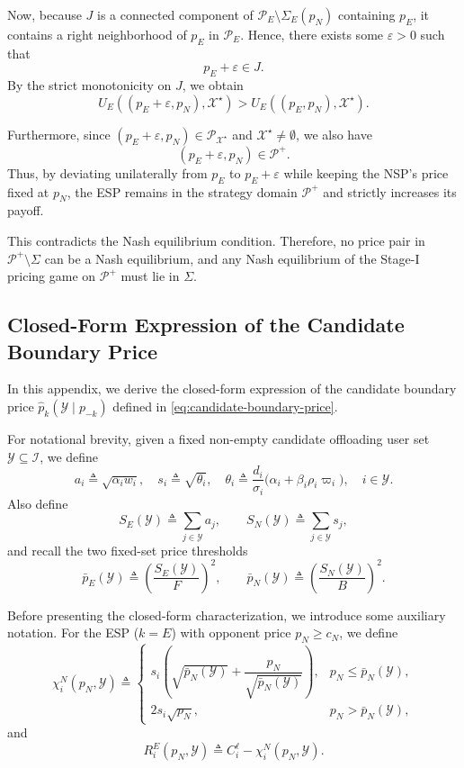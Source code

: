 \documentclass[lettersize,journal]{IEEEtran}
\begin{document}
Now, because $J$ is a connected component of $\mathcal P_E\setminus\Sigma_E(p_N)$ containing $p_E$, it contains a right neighborhood of $p_E$ in $\mathcal P_E$. Hence, there exists some $\varepsilon>0$ such that
\[
p_E+\varepsilon\in J.
\]
By the strict monotonicity on $J$, we obtain
\[
U_E((p_E+\varepsilon,p_N),\mathcal X^\star)
>
U_E((p_E,p_N),\mathcal X^\star).
\]

Furthermore, since $(p_E+\varepsilon,p_N)\in \mathcal P_{\mathcal X^\star}$ and $\mathcal X^\star\neq\emptyset$, we also have
\[
(p_E+\varepsilon,p_N)\in \mathcal P^{+}.
\]
Thus, by deviating unilaterally from $p_E$ to $p_E+\varepsilon$ while keeping the NSP's price fixed at $p_N$, the ESP remains in the strategy domain $\mathcal P^{+}$ and strictly increases its payoff.

This contradicts the Nash equilibrium condition.
Therefore, no price pair in $\mathcal P^{+}\setminus\Sigma$ can be a Nash equilibrium, and any Nash equilibrium of the Stage-I pricing game on $\mathcal P^{+}$ must lie in $\Sigma$.

\subsection{Closed-Form Expression of the Candidate Boundary Price}
\label{app:closed-form-boundary-price}

In this appendix, we derive the closed-form expression of the candidate boundary price
$\widehat p_k(\mathcal Y\mid p_{-k})$ defined in \eqref{eq:candidate-boundary-price}.

For notational brevity, given a fixed non-empty candidate offloading user set
$\mathcal Y\subseteq\mathcal I$, we define
\[
a_i \triangleq \sqrt{\alpha_i w_i},
\quad
s_i \triangleq \sqrt{\theta_i},
\quad
\theta_i \triangleq \frac{d_i}{\sigma_i}\bigl(\alpha_i+\beta_i\rho_i\varpi_i\bigr),
\quad i\in\mathcal Y.
\]
Also define
\[
S_E(\mathcal Y)\triangleq \sum_{j\in\mathcal Y} a_j,
\qquad
S_N(\mathcal Y)\triangleq \sum_{j\in\mathcal Y} s_j,
\]
and recall the two fixed-set price thresholds
\[
\bar p_E(\mathcal Y)\triangleq \left(\frac{S_E(\mathcal Y)}{F}\right)^2,
\qquad
\bar p_N(\mathcal Y)\triangleq \left(\frac{S_N(\mathcal Y)}{B}\right)^2.
\]

Before presenting the closed-form characterization, we introduce some auxiliary notation. For the ESP ($k=E$) with opponent price $p_N\ge c_N$, we define
\[
\chi_i^N(p_N,\mathcal{Y}) \triangleq
\begin{cases}
s_i\!\left( \sqrt{\bar p_N(\mathcal{Y})} + \dfrac{p_N}{\sqrt{\bar p_N(\mathcal{Y})}} \right), & p_N\le \bar p_N(\mathcal{Y}),\\[2ex]
2s_i\sqrt{p_N}, & p_N>\bar p_N(\mathcal{Y}),
\end{cases}
\]
and
\[
R_i^E(p_N,\mathcal{Y}) \triangleq C_i^\ell - \chi_i^N(p_N,\mathcal{Y}).
\]
\end{document}
